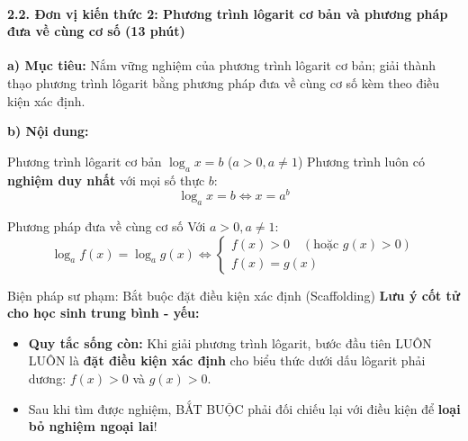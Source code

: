 \documentclass[12pt, a4paper]{article}
\begin{document}
\paragraph{2.2. Đơn vị kiến thức 2: Phương trình lôgarit cơ bản và phương pháp đưa về cùng cơ số (13 phút)}

\noindent \textbf{a) Mục tiêu:}
Nắm vững nghiệm của phương trình lôgarit cơ bản; giải thành thạo phương trình lôgarit bằng phương pháp đưa về cùng cơ số kèm theo điều kiện xác định.

\noindent \textbf{b) Nội dung:}
\begin{pedabox}{Phương trình lôgarit cơ bản $\log_a x = b$ ($a > 0, a \neq 1$)}
Phương trình luôn có \textbf{nghiệm duy nhất} với mọi số thực $b$:
$$\log_a x = b \iff x = a^b$$
\end{pedabox}

\begin{pedabox}{Phương pháp đưa về cùng cơ số}
Với $a > 0, a \neq 1$:
$$\log_a f(x) = \log_a g(x) \iff \begin{cases} f(x) > 0 \quad (\text{hoặc } g(x) > 0) \\ f(x) = g(x) \end{cases}$$
\end{pedabox}

\begin{scaffoldbox}{Biện pháp sư phạm: Bắt buộc đặt điều kiện xác định (Scaffolding)}
\textbf{Lưu ý cốt tử cho học sinh trung bình - yếu:}
\begin{itemize}
    \item \textbf{Quy tắc sống còn:} Khi giải phương trình lôgarit, bước đầu tiên LUÔN LUÔN là \textbf{đặt điều kiện xác định} cho biểu thức dưới dấu lôgarit phải dương: $f(x) > 0$ và $g(x) > 0$.
    \item Sau khi tìm được nghiệm, BẮT BUỘC phải đối chiếu lại với điều kiện để \textbf{loại bỏ nghiệm ngoại lai}!
\end{itemize}
\end{scaffoldbox}
\end{document}
